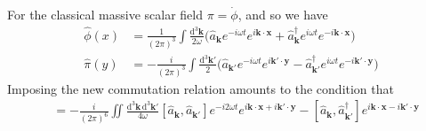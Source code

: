 \documentclass{article}
\begin{document}
	For the classical massive scalar field $\pi = \dot\phi$, and so we have
	\begin{align*}
		\hat{\phi}(x) &= \frac{1}{(2\pi)^3}\int\frac{\mathrm{d}^3\mathbf{k}}{2\omega}\Big(\hat{a}_{\mathbf{k}}e^{-i\omega t}e^{i\mathbf{k}\cdot\mathbf{x}} + \hat{a}_{\mathbf{k}}^\dagger e^{i\omega t}e^{-i\mathbf{k}\cdot\mathbf{x}}\Big) \\
		\hat{\pi}(y) &= {-\frac{i}{(2\pi)^3}}\int\frac{\mathrm{d}^3\mathbf{k}'}{2}\Big(\hat{a}_{\mathbf{k}'}e^{-i\omega t}e^{i\mathbf{k}'\cdot\mathbf{y}} - \hat{a}_{\mathbf{k}'}^\dagger e^{i\omega t}e^{-i\mathbf{k}'\cdot\mathbf{y}}\Big)
	\end{align*}
	Imposing the new commutation relation amounts to the condition that
	\begin{align*}
		[\hat{\phi}(t, \mathbf{x}), \hat{\pi}(t, \mathbf{y})] &= {-\frac{i}{(2\pi)^6}}\iint\frac{\mathrm{d}^3\mathbf{k}\,\mathrm{d}^3\mathbf{k}'}{4\omega}[\hat{a}_{\mathbf{k}}, \hat{a}_{\mathbf{k}'}]e^{-i2\omega t}e^{i\mathbf{k}\cdot\mathbf{x} + i\mathbf{k}'\cdot\mathbf{y}} - [\hat{a}_{\mathbf{k}}, \hat{a}_{\mathbf{k}'}^\dagger]e^{i\mathbf{k}\cdot\mathbf{x}-i\mathbf{k}'\cdot\mathbf{y}}
	\end{align*}
	
	
\end{document}
